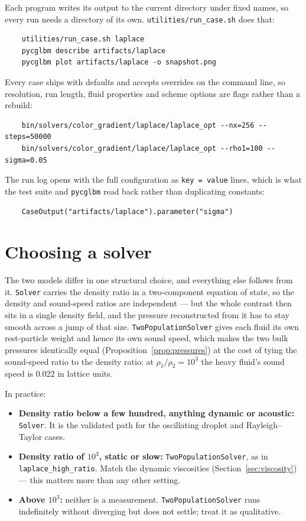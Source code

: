 \documentclass[11pt,a4paper]{article}
\theoremstyle{plain}
\theoremstyle{definition}
\begin{document}
Each program writes its output to the current directory under fixed names, so
every run needs a directory of its own. \texttt{utilities/run\_case.sh} does
that:

\begin{verbatim}
    utilities/run_case.sh laplace
    pycglbm describe artifacts/laplace
    pycglbm plot artifacts/laplace -o snapshot.png
\end{verbatim}

Every case ships with defaults and accepts overrides on the command line, so
resolution, run length, fluid properties and scheme options are flags rather
than a rebuild:

\begin{verbatim}
    bin/solvers/color_gradient/laplace/laplace_opt --nx=256 --steps=50000
    bin/solvers/color_gradient/laplace/laplace_opt --rho1=100 --sigma=0.05
\end{verbatim}

The run log opens with the full configuration as \texttt{key = value} lines,
which is what the test suite and \texttt{pycglbm} read back rather than
duplicating constants:

\begin{verbatim}
    CaseOutput("artifacts/laplace").parameter("sigma")
\end{verbatim}

\section{Choosing a solver}
\label{sec:choosing}

The two models differ in one structural choice, and everything else follows from
it. \texttt{Solver} carries the density ratio in a two-component equation of
state, so the density and sound-speed ratios are independent --- but the whole
contrast then sits in a single density field, and the pressure reconstructed
from it has to stay smooth across a jump of that size.
\texttt{TwoPopulationSolver} gives each fluid its own rest-particle weight and
hence its own sound speed, which makes the two bulk pressures identically equal
(Proposition~\ref{prop:pressures}) at the cost of tying the sound-speed ratio to
the density ratio: at $\rho_1/\rho_2 = 10^3$ the heavy fluid's sound speed is
$0.022$ in lattice units.

In practice:

\begin{itemize}
\item \textbf{Density ratio below a few hundred, anything dynamic or acoustic:}
      \texttt{Solver}. It is the validated path for the oscillating droplet and
      Rayleigh--Taylor cases.
\item \textbf{Density ratio of $10^3$, static or slow:}
      \texttt{TwoPopulationSolver}, as in \texttt{laplace\_high\_ratio}. Match
      the dynamic viscosities (Section~\ref{sec:viscosity}) --- this matters
      more than any other setting.
\item \textbf{Above $10^3$:} neither is a measurement.
      \texttt{TwoPopulationSolver} runs indefinitely without diverging but does
      not settle; treat it as qualitative.
\end{itemize}
\end{document}
